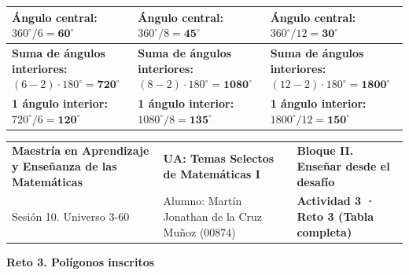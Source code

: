 \documentclass[spanish,letterpaper,landscape]{article}
\begin{document}
\begin{tabularx}{\textwidth}{|>{\raggedright\arraybackslash}X|>{\raggedright\arraybackslash}X|>{\raggedright\arraybackslash}X|}
\textbf{\small Ángulo central:} $360^\circ / 6 = \mathbf{60^\circ}$ & \textbf{\small Ángulo central:} $360^\circ / 8 = \mathbf{45^\circ}$ & \textbf{\small Ángulo central:} $360^\circ / 12 = \mathbf{30^\circ}$ \\\hline
\textbf{\small Suma de ángulos interiores:} $(6-2)\cdot 180^\circ = \mathbf{720^\circ}$ & \textbf{\small Suma de ángulos interiores:} $(8-2)\cdot 180^\circ = \mathbf{1080^\circ}$ & \textbf{\small Suma de ángulos interiores:} $(12-2)\cdot 180^\circ = \mathbf{1800^\circ}$ \\\hline
\textbf{\small 1 ángulo interior:} $720^\circ / 6 = \mathbf{120^\circ}$ & \textbf{\small 1 ángulo interior:} $1080^\circ / 8 = \mathbf{135^\circ}$ & \textbf{\small 1 ángulo interior:} $1800^\circ / 12 = \mathbf{150^\circ}$ \\\hline
\end{tabularx}

\newpage
\noindent
\begin{tabularx}{\textwidth}{@{} >{\raggedright\arraybackslash}p{} >{\centering\arraybackslash}X >{\raggedleft\arraybackslash}p{} @{}}
\footnotesize \textbf{Maestría en Aprendizaje y Enseñanza de las Matemáticas} &
\footnotesize \textbf{UA: Temas Selectos de Matemáticas I} &
\footnotesize \textbf{Bloque II. Enseñar desde el desafío} \\
\footnotesize Sesión 10. Universo 3-60 &
\footnotesize Alumno: Martín Jonathan de la Cruz Muñoz (00874) &
\footnotesize \textbf{Actividad 3 · Reto 3 (Tabla completa)}
\end{tabularx}

\vspace{4pt}
\begin{center}
  {\normalsize\bfseries Reto 3. Polígonos inscritos}
\end{center}
\vspace{4pt}
\renewcommand{\arraystretch}{1.28}
\end{document}
